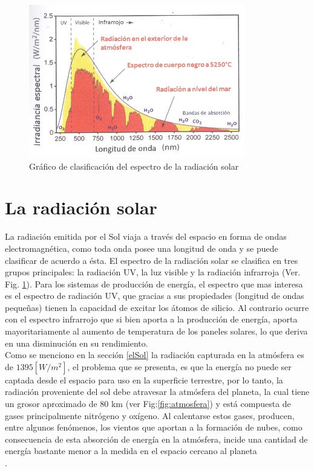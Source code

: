 \begin{figure}[h!]
        \centering
        \includegraphics[scale=0.45]{images/espectroSolar}
        \caption{Gráfico de clasificación del espectro de la radiación solar\cite{recursoSolar:1}}
	\label{espectro}
\end{figure}

\section{La radiación solar}
La radiación emitida por el Sol viaja a través del espacio en forma de ondas electromagnética, como toda onda posee una longitud de onda y se puede clasificar de acuerdo a ésta. El espectro de la radiación solar se clasifica en tres grupos principales: la radiación UV, la luz visible y la radiación infrarroja (Ver. Fig. \ref{espectro}). Para los sistemas de producción de energía, el espectro que mas interesa es el espectro de radiación UV, que gracias a sus propiedades (longitud de ondas pequeñas) tienen la capacidad de excitar los átomos de silicio. Al contrario ocurre con el espectro infrarrojo que si bien aporta a la producción de energía, aporta mayoritariamente al aumento de temperatura de los paneles solares, lo que deriva en una disminución en su rendimiento.\\

Como se menciono en la sección \ref{elSol} la radiación capturada en la atmósfera es de $1395 [W/m^{2}]$, el problema que se presenta, es que la energía no puede ser captada desde el espacio para uso en la superficie terrestre, por lo tanto, la radiación proveniente del sol debe atravesar la atmósfera del planeta, la cual tiene un grosor aproximado de 80 km (ver Fig:\ref{fig:atmosfera}) y está compuesta de gases principalmente nitrógeno y oxígeno\cite{recursoSolar:1}. Al calentarse estos gases, producen, entre algunos fenómenos, los vientos que aportan a la formación de nubes, como consecuencia de esta absorción de energía en la atmósfera, incide una cantidad de energía bastante menor a la medida en el espacio cercano al planeta\\.

